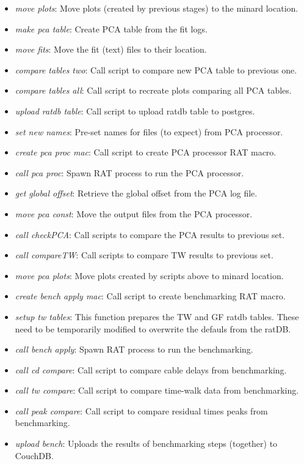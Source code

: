 \documentclass[12pt]{article}
\begin{document}
\begin{itemize}
	\item \textit{move plots}: Move plots (created by previous stages) to the minard location.
	\item \textit{make pca table}: Create PCA table from the fit logs.
	\item \textit{move fits}: Move the fit (text) files to their location. 
	\item \textit{compare tables two}: Call script to compare new PCA table to previous one.
	\item \textit{compare tables all}: Call script to recreate plots comparing all PCA tables.
	\item \textit{upload ratdb table}: Call script to upload ratdb table to postgres.
	\item \textit{set new names}: Pre-set names for files (to expect) from PCA processor.
	\item \textit{create pca proc mac}: Call script to create PCA processor RAT macro.
	\item \textit{call pca proc}: Spawn RAT process to run the PCA processor.
	\item \textit{get global offset}: Retrieve the global offset from the PCA log file.
	\item \textit{move pca const}: Move the output files from the PCA processor.
	\item \textit{call checkPCA}: Call scripts to compare the PCA results to previous set.
	\item \textit{call compareTW}: Call scripts to compare TW results to previous set.
	\item \textit{move pca plots}: Move plots created by scripts above to minard location.
	\item \textit{create bench apply mac}: Call script to create benchmarking RAT macro.
	\item \textit{setup tw tables}: This function prepares the TW and GF ratdb tables. These need to be temporarily modified to overwrite the defauls from the ratDB.
	\item \textit{call bench apply}: Spawn RAT process to run the benchmarking.
	\item \textit{call cd compare}: Call script to compare cable delays from benchmarking.
	\item \textit{call tw compare}: Call script to compare time-walk data from benchmarking.
	\item \textit{call peak compare}: Call script to compare residual times peaks from benchmarking.
	\item \textit{upload bench}: Uploads the results of benchmarking steps (together) to CouchDB.

\end{itemize}
\end{document}
